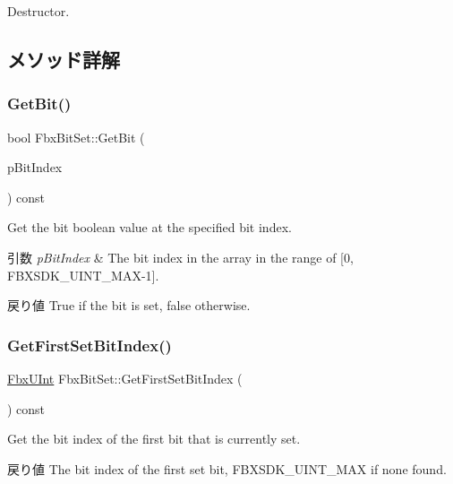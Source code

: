 Destructor. 



\subsection{メソッド詳解}
\mbox{\label{class_fbx_bit_set_a79b538f2c893476457eac2b11d1d7e28}} 
\subsubsection{\texorpdfstring{Get\+Bit()}{GetBit()}}
{\footnotesize\ttfamily bool Fbx\+Bit\+Set\+::\+Get\+Bit (\begin{DoxyParamCaption}\item[{const \hyperlink{fbxtypes_8h_ae9fb141d8158a730aa85ec5ff2ea3f6b}{Fbx\+U\+Int}}]{p\+Bit\+Index }\end{DoxyParamCaption}) const}

Get the bit boolean value at the specified bit index. 
\begin{DoxyParams}{引数}
{\em p\+Bit\+Index} & The bit index in the array in the range of \mbox{[}0, F\+B\+X\+S\+D\+K\+\_\+\+U\+I\+N\+T\+\_\+\+M\+A\+X-\/1\mbox{]}. \\
\hline
\end{DoxyParams}
\begin{DoxyReturn}{戻り値}
True if the bit is set, false otherwise. 
\end{DoxyReturn}
\mbox{\label{class_fbx_bit_set_ac7747c0ffab8b6d63d931e52548a0f2a}} 
\subsubsection{\texorpdfstring{Get\+First\+Set\+Bit\+Index()}{GetFirstSetBitIndex()}}
{\footnotesize\ttfamily \hyperlink{fbxtypes_8h_ae9fb141d8158a730aa85ec5ff2ea3f6b}{Fbx\+U\+Int} Fbx\+Bit\+Set\+::\+Get\+First\+Set\+Bit\+Index (\begin{DoxyParamCaption}{ }\end{DoxyParamCaption}) const}

Get the bit index of the first bit that is currently set. \begin{DoxyReturn}{戻り値}
The bit index of the first set bit, F\+B\+X\+S\+D\+K\+\_\+\+U\+I\+N\+T\+\_\+\+M\+AX if none found. 
\end{DoxyReturn}
\mbox{\label{class_fbx_bit_set_af7459511dca956e445c733e1b1b43ef9}} 

